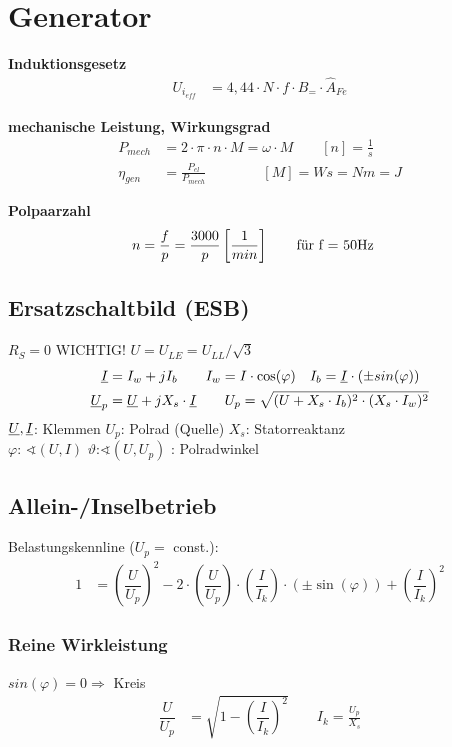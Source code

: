 \clearpage
\section{Generator}
\textbf{Induktionsgesetz}
\begin{align*}
    U_{i_{\mathit{eff}}} &= 4,44 \cdot N \cdot f \cdot B_= \cdot \hat{A}_{Fe}
\end{align*}

\textbf{mechanische Leistung, Wirkungsgrad}
\begin{align*}
    P_{mech}&=2\cdot \pi \cdot n \cdot M = \omega \cdot M \qquad [n]=\frac{1}{s}\\
    \eta_{gen} &= \frac{P_{el}}{P_{mech}} \qquad \qquad [M]=Ws=Nm=J
\end{align*}

\textbf{Polpaarzahl}
\begin{align*}
    n &=\frac{f}{p}= \dfrac{3000}{p} \left[ \frac{1}{min}\right] \qquad \textnormal{für f = 50Hz}
    \end{align*}

\subsection{Ersatzschaltbild (ESB)}
$R_S = 0$ \qquad WICHTIG! $U = U_{LE} = U_{LL}/\sqrt{3}$
\begin{align*}
    \underline{I} &= I_w +jI_b \qquad I_w = I \cdot \cos(\varphi) \quad I_b = \underline{I}\cdot (\pm sin(\varphi))\\
    \underline{U}_p &= \underline{U} +jX_s \cdot \underline{I} \qquad
    U_p = \sqrt{(U+X_s\cdot I_b)^2 \cdot (X_s\cdot I_w)^2}
\end{align*}
$\underline{U}, \underline{I}$: Klemmen \quad $U_p$: Polrad (Quelle) \quad $X_s$: Statorreaktanz \\
$\varphi$: $\sphericalangle (U, I)$ \qquad $\vartheta$:$\sphericalangle (U, U_p)$ : Polradwinkel

\subsection{Allein-/Inselbetrieb}
Belastungskennline ($U_p=$ const.):
\begin{align*}
    1 &= \left( \dfrac{U}{U_p} \right)^2 - 2 \cdot \left( \dfrac{U}{U_p}\right) \cdot \left( \dfrac{I}{I_k}\right) \cdot (\pm \sin(\varphi)) + \left(\dfrac{I}{I_k}\right)^2
\end{align*}
\subsubsection{Reine Wirkleistung}
$sin(\varphi) = 0 \Rightarrow$ Kreis
\begin{align*}
    \dfrac{U}{U_p} &= \sqrt{1- \left(\dfrac{I}{I_k}\right)^2} \qquad I_k = \frac{U_p}{X_s}
\end{align*}

